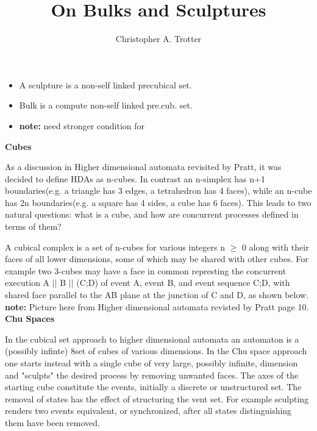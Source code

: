 \documentclass[a4paper,11pt]{article}
\begin{document}
\title{On Bulks and Sculptures}

\author{Christopher A. Trotter}

\maketitle

\begin{itemize}
    \item A sculpture is a non-self linked precubical set.
    \item Bulk is a compute non-self linked pre.cub. set.
    \item \textbf{note:} need stronger condition for
\end{itemize}

    \noindent \textbf{Cubes}
    
    \noindent As a discussion in Higher dimensional automata revisited by Pratt, it was decided to define HDAs as n-cubes. In contrast an n-simplex has n+1 boundaries(e.g. a triangle has 3 edges, a tetrahedron has 4 faces), while an n-cube has 2n boundaries(e.g. a square has 4 sides, a cube has 6 faces). This leads to two natural questions: what is a cube, and how are concurrent processes defined in terms of them?
    
    A cubical complex is a set of n-cubes for various integers n $\geq$ 0 along with their faces of all lower dimensions, some of which may be shared with other cubes. For example two 3-cubes may have a face in common represting the concurrent execution A $\vert\vert$ B $\vert\vert$ (C;D) of event A, event B, and event sequence C;D, with shared face parallel to the AB plane at the junction of C and D, as shown below.\\
    
    \noindent \textbf{note:} Picture here from Higher dimensional automata revisted by Pratt page 10.\\
    
    
    \noindent \textbf{Chu Spaces}
    
    \noindent In the cubical set approach to higher dimensional automata an automaton is a (possibly infinte) 8set of cubes of various dimensions. In the Chu space approach one starts instead with a single cube of very large, possibly infinite, dimension and "sculpts" the desired process by removing unwanted faces. The axes of the starting cube constitute the events, initially a discrete or unstructured set. The removal of states has the effect of structuring the vent set. For example sculpting renders two events equivalent, or synchronized, after all states distinguishing them have been removed.
    
\end{document}
